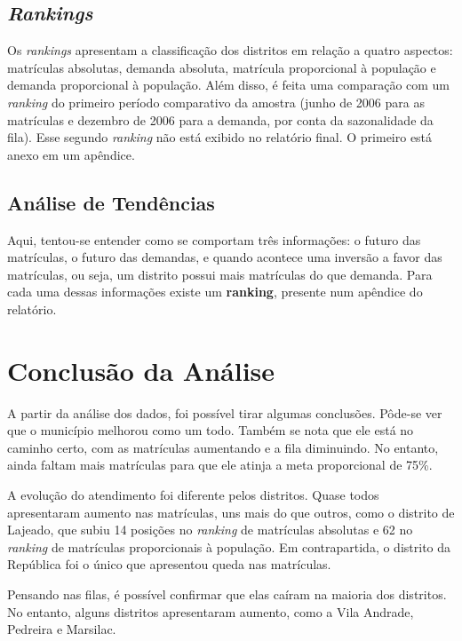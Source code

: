 \documentclass[12pt, a4paper]{article}
\begin{document}
\subsection{\textit{Rankings}}

Os \textit{rankings} apresentam a classificação dos distritos em relação a quatro aspectos: matrículas absolutas, demanda absoluta, matrícula proporcional à população e demanda proporcional à população. Além disso, é feita uma comparação com um \textit{ranking} do primeiro período comparativo da amostra (junho de 2006 para as matrículas e dezembro de 2006 para a demanda, por conta da sazonalidade da fila). Esse segundo \textit{ranking} não está exibido no relatório final. O primeiro está anexo em um apêndice.  

\subsection{Análise de Tendências}

Aqui, tentou-se entender como se comportam três informações: o futuro das matrículas, o futuro das demandas, e quando acontece uma inversão a favor das matrículas, ou seja, um distrito possui mais matrículas do que demanda. Para cada uma dessas informações existe um \textbf{ranking}, presente num apêndice do relatório.

\section{Conclusão da Análise}

A partir da análise dos dados, foi possível tirar algumas conclusões. Pôde-se ver que o município melhorou como um todo. Também se nota que ele está no caminho certo, com as matrículas aumentando e a fila diminuindo. No entanto, ainda faltam mais matrículas para que ele atinja a meta proporcional de 75\%.

A evolução do atendimento foi diferente pelos distritos. Quase todos apresentaram aumento nas matrículas, uns mais do que outros, como o distrito de Lajeado, que subiu 14 posições no \textit{ranking} de matrículas absolutas e 62 no \textit{ranking} de matrículas proporcionais à população. Em contrapartida, o distrito da República foi o único que apresentou queda nas matrículas.

Pensando nas filas, é possível confirmar que elas caíram na maioria dos distritos. No entanto, alguns distritos apresentaram aumento, como a Vila Andrade, Pedreira e Marsilac.
\end{document}
